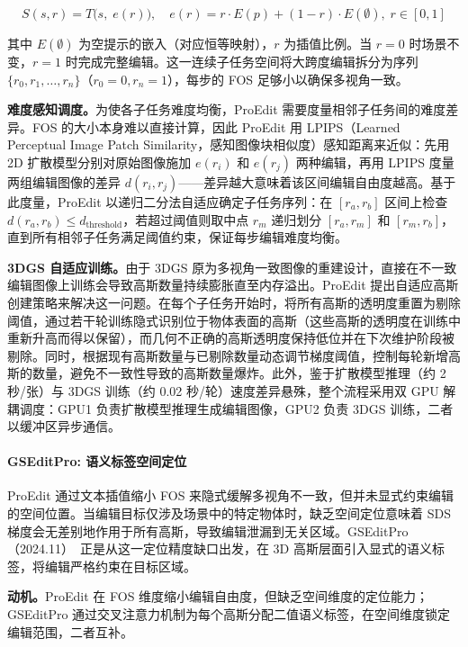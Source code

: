 \begin{equation}
    S(s, r) = T\big(s,\; e(r)\big), \quad e(r) = r \cdot E(p) + (1-r) \cdot E(\emptyset),\; r \in [0,1]
\end{equation}

其中 $E(\emptyset)$ 为空提示的嵌入（对应恒等映射），$r$ 为插值比例。当 $r=0$ 时场景不变，$r=1$ 时完成完整编辑。这一连续子任务空间将大跨度编辑拆分为序列 $\{r_0, r_1, \ldots, r_n\}$（$r_0=0, r_n=1$），每步的 FOS 足够小以确保多视角一致。

\textbf{难度感知调度。}为使各子任务难度均衡，ProEdit 需要度量相邻子任务间的难度差异。FOS 的大小本身难以直接计算，因此 ProEdit 用 LPIPS（Learned Perceptual Image Patch Similarity，感知图像块相似度）感知距离来近似：先用 2D 扩散模型分别对原始图像施加 $e(r_i)$ 和 $e(r_j)$ 两种编辑，再用 LPIPS 度量两组编辑图像的差异 $d(r_i, r_j)$——差异越大意味着该区间编辑自由度越高。基于此度量，ProEdit 以递归二分法自适应确定子任务序列：在 $[r_a, r_b]$ 区间上检查 $d(r_a, r_b) \leq d_{\text{threshold}}$，若超过阈值则取中点 $r_m$ 递归划分 $[r_a, r_m]$ 和 $[r_m, r_b]$，直到所有相邻子任务满足阈值约束，保证每步编辑难度均衡。

\textbf{3DGS 自适应训练。}由于 3DGS 原为多视角一致图像的重建设计，直接在不一致编辑图像上训练会导致高斯数量持续膨胀直至内存溢出。ProEdit 提出自适应高斯创建策略来解决这一问题。在每个子任务开始时，将所有高斯的透明度重置为剔除阈值，通过若干轮训练隐式识别位于物体表面的高斯（这些高斯的透明度在训练中重新升高而得以保留），而几何不正确的高斯透明度保持低位并在下次维护阶段被剔除。同时，根据现有高斯数量与已剔除数量动态调节梯度阈值，控制每轮新增高斯的数量，避免不一致性导致的高斯数量爆炸。此外，鉴于扩散模型推理（约 2 秒/张）与 3DGS 训练（约 0.02 秒/轮）速度差异悬殊，整个流程采用双 GPU 解耦调度：GPU1 负责扩散模型推理生成编辑图像，GPU2 负责 3DGS 训练，二者以缓冲区异步通信。

\paragraph{GSEditPro: 语义标签空间定位}

ProEdit 通过文本插值缩小 FOS 来隐式缓解多视角不一致，但并未显式约束编辑的空间位置。当编辑目标仅涉及场景中的特定物体时，缺乏空间定位意味着 SDS 梯度会无差别地作用于所有高斯，导致编辑泄漏到无关区域。GSEditPro（2024.11）~\cite{2411_10033}正是从这一定位精度缺口出发，在 3D 高斯层面引入显式的语义标签，将编辑严格约束在目标区域。

\textbf{动机。}ProEdit 在 FOS 维度缩小编辑自由度，但缺乏空间维度的定位能力；GSEditPro 通过交叉注意力机制为每个高斯分配二值语义标签，在空间维度锁定编辑范围，二者互补。


